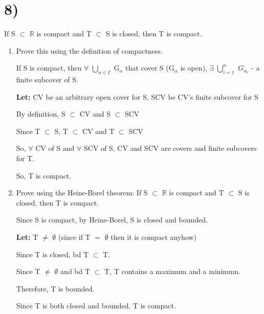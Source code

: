 \documentclass{article}
\newcommand{\mt}[1]{\ensuremath{#1}}
\newcommand\bsc[2][\DefaultOpt]{%
  \def\DefaultOpt{#2}%
  \section[#1]{#2}%
}
\newcommand{\balist}{\begin{enumerate}[label=\alph*.]}
\newcommand{\elist}{\end{enumerate}}
\newcommand{\lt}[1]{\textbf{Let: } #1}
\newcommand{\dbs}[3]{\mt{#1_{#2_#3}}}
\newcommand{\br}{\mt{\mathbb{R}} }       %
\newcommand{\fa}{\mt{\forall} }          %
\newcommand{\afa}{\mt{\alpha} }
\newcommand{\mem}{\mt{\in} }
\newcommand{\exs}{\mt{\exists} }
\newcommand{\es}{\mt{\emptyset} }        %
\newcommand{\sbs}{\mt{\subset} }         %
\newcommand{\eql}{\mt{=} }
\newcommand{\uw}[2]{#1\mt{_{#2}}}
\newcommand{\urng}[2]{\mt{\bigcup_{#1}^{#2}}}
\begin{document}
\bsc{8)}{
If S \sbs \br is compact and T \sbs S is closed, then T is compact.

\balist
\item Prove this using the definition of compactness.
	
	If S is compact, then \fa \urng{\afa \mem I}{} \uw{G}{\afa} that cover S (\uw{G}{\afa} is open), \exs \urng{i = 1}{n} \dbs{G}{\afa}{i} - a finite subcover of S.
	
	\lt{CV be an arbitrary open cover for S, SCV be CV's finite subcover for S}
	
	By definition, S \sbs CV and S \sbs SCV
	
	Since T \sbs S, T \sbs CV and T \sbs SCV
	
	So, \fa CV of S and \fa SCV of S, CV and SCV are covers and finite subcovers for T.
	
	 So, T is compact.
	
	
	
	
\item Prove using the Heine-Borel theorem: If S \sbs \br is compact and T \sbs S is closed, then T is compact.

	Since S is compact, by Heine-Borel, S is closed and bounded.
	
	\lt{T $\neq$ \es} (since if T \eql \es then it is compact anyhow)
	
	Since T is closed, bd T \sbs T.
	
	Since T $\neq$ \es and bd T \sbs T, T contains a maximum and a minimum.
	
	Therefore, T is bounded.
	
	Since T is both closed and bounded, T is compact.
	
	
\elist

}
\end{document}
